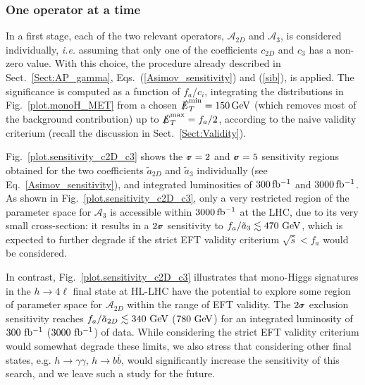 \documentclass[11pt]{article}
\newcommand{\Bsigma}{\mbox{$\hspace{0.12em}\shortmid\hspace{-0.62em}\sigma$}}
\newcommand{\A}{\mathcal{A}}
\newcommand{\at}{\tilde{a}}
\newcommand{\ETmiss}{\slashed{E}_T}
\renewcommand{\to}{\rightarrow}
\renewcommand{\[}{\begin{equation}}
\renewcommand{\]}{\end{equation}}
\begin{document}
\vspace{-3mm}

\subsubsection*{One operator at a time}

\vspace{-2mm}

In a first stage, each of the two relevant operators, $\A_{2D}$ and $\A_3$, is considered individually, {\it i.e.} assuming that only one of the 
coefficients $c_{2D}$ and $c_3$ has a non-zero value. With this choice, 
the procedure already described in Sect.~\ref{Sect:AP_gamma}, Eqs.~(\ref{Asimov_sensitivity}) and (\ref{sib}), is applied. 
The significance  is computed as a function of $f_a/c_i$, integrating the distributions in Fig.~\ref{plot.monoH_MET}  from a 
chosen $\ETmiss^\mathrm{min}=\unit[150]{GeV}$ (which removes most of the background contribution) up to $\ETmiss^\mathrm{max}=f_a /2$, according to the naive validity criterium (recall the discussion in Sect.~\ref{Sect:Validity}).


Fig.~\ref{plot.sensitivity_c2D_c3} shows the $\Bsigma=2$ and $\Bsigma=5$ sensitivity regions obtained for the two coefficients $\at_{2D}$ and $\at_3$ 
individually (see Eq.~\eqref{Asimov_sensitivity}), and integrated luminosities of $\unit[300]{fb^{-1}}$ and $\unit[3000]{fb^{-1}}$. 
As shown in Fig.~\ref{plot.sensitivity_c2D_c3}, only a very restricted region of the parameter space for $\A_3$ is accessible within 
$\unit[3000]{fb^{-1}}$ at the LHC, due to its very small cross-section: it results in a $2\Bsigma$ sensitivity to $f_a / \at_3 \lesssim \unit[470]{\,GeV}$, which is 
expected to further degrade if the strict EFT validity criterium $\sqrt{\hat{s}} < f_a$ would be considered.


In contrast, Fig.~\ref{plot.sensitivity_c2D_c3} illustrates 
that mono-Higgs signatures in the $h \to 4 \ell$ final state at HL-LHC have the potential to explore some region of parameter space 
for $\A_{2D}$ within the range of EFT validity. The $2\Bsigma$ exclusion sensitivity 
reaches $f_a / \at_{2D} \lesssim \unit[340]{\,GeV}$ ($ \unit[780]{\,GeV}$) for an integrated luminosity of $\unit[300]{\,fb^{-1}}$ ($\unit[3000]{\,fb^{-1}}$) of data.
While considering the strict EFT validity criterium would somewhat degrade these limits, we also stress that considering other final states,
e.g. $h \to \gamma\gamma$, $h \to b \bar{b}$, would significantly increase the sensitivity of this search, and we leave such a study for the future. 
\end{document}
